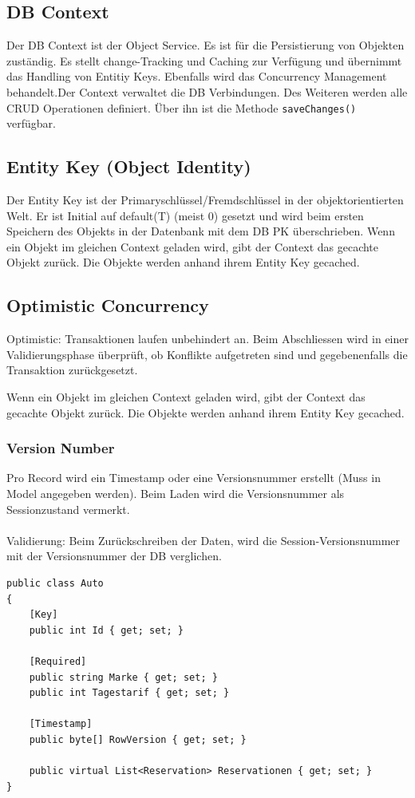 \documentclass[
a4paper,
oneside,
10pt,
fleqn,
headsepline,
toc=listofnumbered, 
bibliography=totocnumbered]{scrartcl}
\begin{document}
\subsection{DB Context}
Der DB Context ist der Object Service. Es ist für die Persistierung von Objekten zuständig. Es stellt change-Tracking und Caching zur Verfügung und übernimmt das Handling von Entitiy Keys. Ebenfalls wird das Concurrency Management behandelt.Der Context verwaltet die DB Verbindungen. Des Weiteren werden alle CRUD Operationen definiert. Über ihn ist die Methode \lstinline|saveChanges()| verfügbar.

\subsection{Entity Key (Object Identity)}
Der Entity Key ist der Primaryschlüssel/Fremdschlüssel in der objektorientierten Welt. Er ist Initial auf default(T) (meist 0) gesetzt und wird beim ersten Speichern des Objekts in der Datenbank mit dem DB PK überschrieben. Wenn ein Objekt im gleichen Context geladen wird, gibt der Context das gecachte Objekt zurück. Die Objekte werden anhand ihrem Entity Key gecached. 

\subsection{Optimistic Concurrency}

Optimistic: Transaktionen laufen unbehindert an. Beim Abschliessen wird in einer Validierungsphase überprüft, ob Konflikte aufgetreten sind und gegebenenfalls die Transaktion zurückgesetzt.

Wenn ein Objekt im gleichen Context geladen wird, gibt der Context das gecachte Objekt zurück.
Die Objekte werden anhand ihrem Entity Key gecached.

\subsubsection{Version Number}
Pro Record wird ein Timestamp oder eine Versionsnummer erstellt (Muss in Model angegeben werden). Beim Laden wird die Versionsnummer als Sessionzustand vermerkt. \\
\\
Validierung: Beim Zurückschreiben der Daten, wird die Session-Versionsnummer mit der Versionsnummer der DB verglichen.

\begin{lstlisting}
public class Auto
{
    [Key]
    public int Id { get; set; }

    [Required]
    public string Marke { get; set; }
    public int Tagestarif { get; set; }

    [Timestamp]
    public byte[] RowVersion { get; set; }
    
    public virtual List<Reservation> Reservationen { get; set; }
}
\end{lstlisting}
\end{document}
